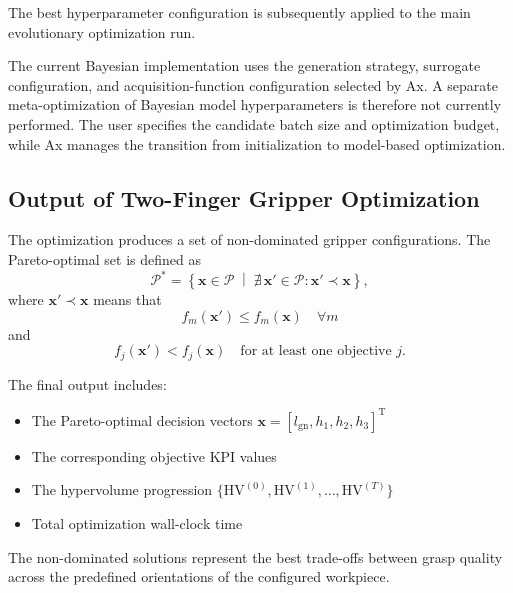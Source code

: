 The best hyperparameter configuration is subsequently applied to the main evolutionary optimization
run.

The current Bayesian implementation uses the generation strategy, surrogate configuration, and
acquisition-function configuration selected by Ax. A separate meta-optimization of Bayesian model
hyperparameters is therefore not currently performed. The user specifies the candidate batch size
and optimization budget, while Ax manages the transition from initialization to model-based
optimization.





\subsection{Output of Two-Finger Gripper Optimization}
\label{sec:two_finger_output}

The optimization produces a set of non-dominated gripper configurations. The Pareto-optimal set is
defined as
\begin{equation}
    \mathcal{P}^{*}
    =
    \left\{
        \mathbf{x}\in\mathcal{P}
        \;\middle|\;
        \nexists\,\mathbf{x}'\in\mathcal{P}:
        \mathbf{x}' \prec \mathbf{x}
    \right\},
\end{equation}
where $\mathbf{x}'\prec\mathbf{x}$ means that
\begin{equation}
    f_m(\mathbf{x}')\leq f_m(\mathbf{x})
    \quad
    \forall m
\end{equation}
and
\begin{equation}
    f_j(\mathbf{x}')<f_j(\mathbf{x})
    \quad
    \text{for at least one objective }j.
\end{equation}

The final output includes:
\begin{itemize}
    \item The Pareto-optimal decision vectors
    $\mathbf{x}=[l_{\mathrm{gn}},h_1,h_2,h_3]^{\mathrm{T}}$
    \item The corresponding objective KPI values
    \item The hypervolume progression
    $\{\mathrm{HV}^{(0)},\mathrm{HV}^{(1)},\ldots,\mathrm{HV}^{(T)}\}$
    \item Total optimization wall-clock time
\end{itemize}

The non-dominated solutions represent the best trade-offs between grasp quality across
the predefined orientations of the configured workpiece.

